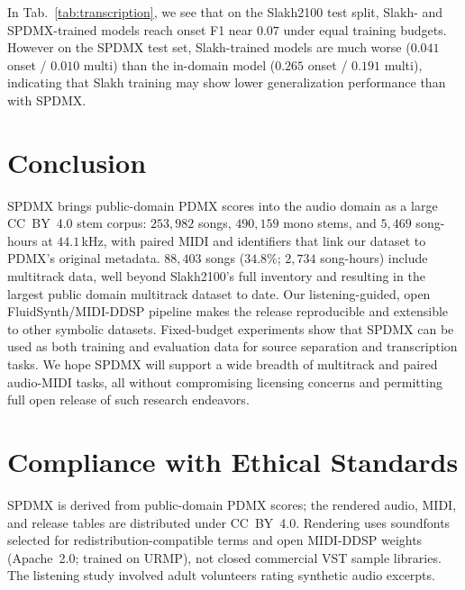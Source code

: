 \documentclass{article}
\begin{document}
In Tab.~\ref{tab:transcription}, we see that on the Slakh2100 test split, Slakh- and SPDMX-trained models reach onset F1 near $0.07$ under equal training budgets.
However on the SPDMX test set, Slakh-trained models are much worse
($0.041$ onset / $0.010$ multi) than the in-domain model ($0.265$ onset / $0.191$ multi), indicating that Slakh training may show lower generalization performance than with SPDMX.

\section{Conclusion}
\label{sec:conclusion}

SPDMX brings public-domain PDMX scores into the audio domain as a large CC~BY~4.0 stem corpus: $253{,}982$ songs, $490{,}159$ mono stems, and $5{,}469$ song-hours at $44.1$\,kHz, with paired MIDI and identifiers that link our dataset to PDMX's original metadata.
$88{,}403$ songs ($34.8\%$; $2{,}734$ song-hours) include multitrack data, well beyond Slakh2100's full inventory and resulting in the largest public domain multitrack dataset to date.
Our listening-guided, open FluidSynth/MIDI-DDSP pipeline makes the release reproducible and extensible to other symbolic datasets. 
Fixed-budget experiments show that SPDMX can be used as both training and evaluation data for source separation and transcription tasks.
We hope SPDMX will support a wide breadth of multitrack and paired audio-MIDI tasks, all without compromising licensing concerns and permitting full open release of such research endeavors.

\section{Compliance with Ethical Standards}
\label{sec:ethics}

SPDMX is derived from public-domain PDMX scores; the rendered audio, MIDI, and release tables are distributed under CC~BY~4.0.
Rendering uses soundfonts selected for redistribution-compatible terms and open MIDI-DDSP weights (Apache~2.0; trained on URMP), not closed commercial VST sample libraries.
The listening study involved adult volunteers rating synthetic audio excerpts.


\makeatletter
\let\jazzsamba@thebibliography\thebibliography
\renewcommand{\thebibliography}[1]{%
  \jazzsamba@thebibliography{#1}%
  \setlength{\itemsep}{0pt plus 0.05pt}%
  \setlength{\parsep}{0pt}%
}
\makeatother

\end{document}
